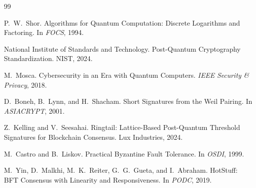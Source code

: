 \documentclass[11pt,a4paper]{article}
\begin{document}

\begin{thebibliography}{99}

P.~W.~Shor.
\newblock Algorithms for Quantum Computation: Discrete Logarithms and
  Factoring.
\newblock In \emph{FOCS}, 1994.

{National Institute of Standards and Technology}.
\newblock Post-Quantum Cryptography Standardization.
\newblock NIST, 2024.

M.~Mosca.
\newblock Cybersecurity in an Era with Quantum Computers.
\newblock \emph{IEEE Security \& Privacy}, 2018.

D.~Boneh, B.~Lynn, and H.~Shacham.
\newblock Short Signatures from the Weil Pairing.
\newblock In \emph{ASIACRYPT}, 2001.

Z.~Kelling and V.~Seesahai.
\newblock Ringtail: Lattice-Based Post-Quantum Threshold Signatures for
  Blockchain Consensus.
\newblock Lux Industries, 2024.

M.~Castro and B.~Liskov.
\newblock Practical Byzantine Fault Tolerance.
\newblock In \emph{OSDI}, 1999.

M.~Yin, D.~Malkhi, M.~K.~Reiter, G.~G.~Gueta, and I.~Abraham.
\newblock HotStuff: BFT Consensus with Linearity and Responsiveness.
\newblock In \emph{PODC}, 2019.

\end{thebibliography}
\end{document}
